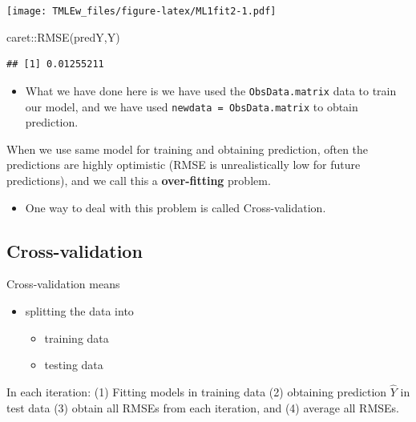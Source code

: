\documentclass[
]{book}
\newenvironment{Shaded}{\begin{snugshade}}{\end{snugshade}}
\newcommand{\FunctionTok}[1]{\textcolor[rgb]{0.00,0.00,0.00}{#1}}
\newcommand{\NormalTok}[1]{#1}
\newcommand{\SpecialCharTok}[1]{\textcolor[rgb]{0.00,0.00,0.00}{#1}}
\providecommand{\tightlist}{%
  \setlength{\itemsep}{0pt}\setlength{\parskip}{0pt}}
\begin{document}
\texttt{[image: TMLEw\_files/figure-latex/ML1fit2-1.pdf]}

\begin{Shaded}
\begin{Highlighting}[]
\NormalTok{caret}\SpecialCharTok{::}\FunctionTok{RMSE}\NormalTok{(predY,Y)}
\end{Highlighting}
\end{Shaded}

\begin{verbatim}
## [1] 0.01255211
\end{verbatim}

\begin{itemize}
\tightlist
\item
  What we have done here is we have used the \texttt{ObsData.matrix} data to train our model, and we have used \texttt{newdata\ =\ ObsData.matrix} to obtain prediction.
\end{itemize}

\begin{rmdcomment}
When we use same model for training and obtaining prediction, often the
predictions are highly optimistic (RMSE is unrealistically low for
future predictions), and we call this a \textbf{over-fitting} problem.
\end{rmdcomment}

\begin{itemize}
\tightlist
\item
  One way to deal with this problem is called Cross-validation.
\end{itemize}

\hypertarget{cross-validation}{%
\subsection{Cross-validation}\label{cross-validation}}

Cross-validation means

\begin{itemize}
\tightlist
\item
  splitting the data into

  \begin{itemize}
  \tightlist
  \item
    training data
  \item
    testing data
  \end{itemize}
\end{itemize}

\begin{rmdcomment}
In each iteration: (1) Fitting models in training data (2) obtaining
prediction \(\hat{Y}\) in test data (3) obtain all RMSEs from each
iteration, and (4) average all RMSEs.
\end{rmdcomment}
\end{document}
